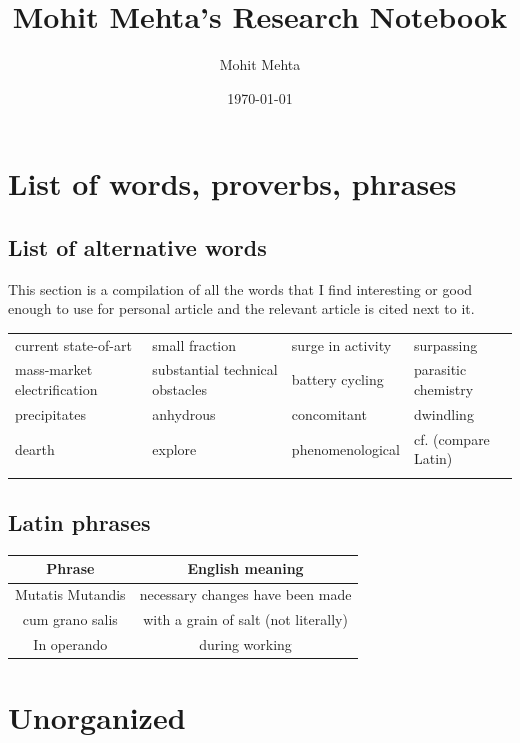 \documentclass[12pt]{book}
\begin{document}
\title{Mohit Mehta's Research Notebook}
\author{Mohit Mehta}
\date{\today}
\maketitle
\tableofcontents
\chapter{List of words, proverbs, phrases}
\section{{List of alternative words}}
This section is a compilation of all the words that I find interesting or good enough to use for personal article and the relevant article is cited next to it.
\begin{center}
	\begin{tabular}{|l l l l|}
		\hline		
		current state-of-art &  small fraction & surge in activity & surpassing \\
		mass-market electrification & substantial technical obstacles & battery cycling & parasitic chemistry\\
		precipitates & anhydrous & concomitant & dwindling \\
		dearth  & explore & phenomenological & cf. (compare Latin)\\
         & & & \\
		\hline
	\end{tabular}
\end{center}

\section{{Latin phrases}}
\begin{center}
	\begin{tabular}{|c || c|}
		\hline		
		Phrase &  English meaning\\
		\hline
		Mutatis Mutandis &  necessary changes have been made\\
		cum grano salis & with a grain of salt (not literally) \\
        In operando & during working\\
		\hline
	\end{tabular}
\end{center}

\chapter{Unorganized}
\end{document}

